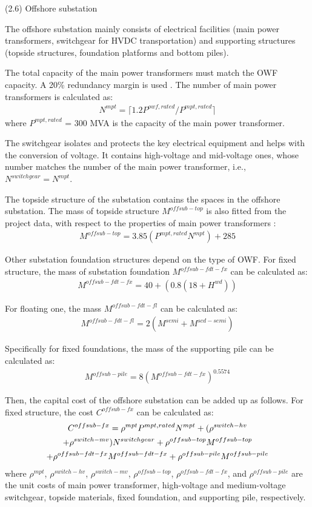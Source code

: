 \documentclass[sn-mathphys,Numbered]{sn-jnl}%
\theoremstyle{plain}%
\theoremstyle{definition}%
\theoremstyle{remark}%
\begin{document}
(2.6) Offshore substation

The offshore substation mainly consists of electrical facilities (main power transformers, switchgear for HVDC transportation) and supporting structures (topside structures, foundation platforms and bottom piles). 

The total capacity of the main power transformers must match the OWF capacity. A 20\% redundancy margin is used \cite{guo2023grid}. The number of main power transformers is calculated as:
\begin{align}
    N^{mpt} = \lceil{1.2 P^{owf,rated} /  P^{mpt,rated}}\rceil
\end{align}
where $P^{mpt,rated}$ = 300 MVA is the capacity of the main power transformer. 

The switchgear isolates and protects the key electrical equipment and helps with the conversion of voltage. It contains high-voltage and mid-voltage ones, whose number matches the number of the main power transformer, i.e., $N^{switchgear} = N^{mpt}$.

The topside structure of the substation contains the spaces in the offshore substation. The mass of topside structure $M^{offsub-top}$ is also fitted from the project data, with respect to the properties of main power transformers \cite{NRELOffshoreBalance}:
\begin{align}
    M^{offsub-top} = 3.85 (P^{mpt,rated} N^{mpt}) + 285
\end{align}

Other substation foundation structures depend on the type of OWF. For fixed structure, the mass of substation foundation $M^{offsub-fdt-fx}$ can be calculated as:
\begin{gather}
    M^{offsub-fdt-fx} = 40 + (0.8(18+H^{wd}))
\end{gather}

For floating one, the mass $M^{offsub-fdt-fl}$ can be calculated as:
\begin{gather}
    M^{offsub-fdt-fl} = 2(M^{semi} + M^{scd-semi})
\end{gather}

Specifically for fixed foundations, the mass of the supporting pile can be calculated as:
\begin{gather}
    M^{offsub-pile} = 8 (M^{offsub-fdt-fx})^{0.5574}
\end{gather}

Then, the capital cost of the offshore substation can be added up as follows. 
For fixed structure, the cost $C^{offsub-fx}$ can be calculated as:
\begin{gather}
    C^{offsub-fx} = \rho^{mpt} P^{mpt,rated} N^{mpt} + (\rho^{switch-hv} 
\notag\\
    + \rho^{switch-mv}) N^{switchgear} + \rho^{offsub-top} M^{offsub-top}
    \notag\\
    + \rho^{offsub-fdt-fx} M^{offsub-fdt-fx} + \rho^{offsub-pile} M^{offsub-pile}
\end{gather}
where $\rho^{mpt}$, $\rho^{switch-hv}$, $\rho^{switch-mv}$, $\rho^{offsub-top}$, $\rho^{offsub-fdt-fx}$, and $\rho^{offsub-pile}$ are the unit costs of main power transformer, high-voltage and medium-voltage switchgear, topside materials, fixed foundation, and supporting pile, respectively.
\end{document}
